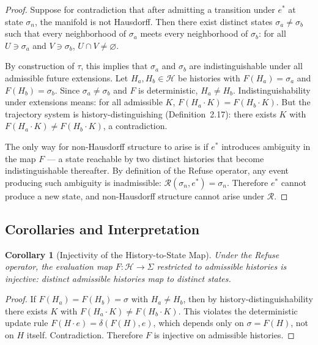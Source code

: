 \documentclass[12pt, twoside]{article}
\theoremstyle{plain}
\newtheorem{corollary}[theorem]{Corollary}
\theoremstyle{definition}
\theoremstyle{remark}
\begin{document}
\begin{proof}
Suppose for contradiction that after admitting a transition
under $e^*$ at state $\sigma_n$, the manifold is not Hausdorff.
Then there exist distinct states $\sigma_a \neq \sigma_b$
such that every neighborhood of $\sigma_a$ meets every neighborhood
of $\sigma_b$:
for all $U \ni \sigma_a$ and $V \ni \sigma_b$,
$U \cap V \neq \varnothing$.

By construction of $\tau$, this implies that $\sigma_a$ and $\sigma_b$
are indistinguishable under all admissible future extensions.
Let $H_a, H_b \in \mathcal{H}$ be histories with
$F(H_a) = \sigma_a$ and $F(H_b) = \sigma_b$.
Since $\sigma_a \neq \sigma_b$ and $F$ is deterministic,
$H_a \neq H_b$.
Indistinguishability under extensions means:
for all admissible $K$, $F(H_a \cdot K) = F(H_b \cdot K)$.
But the trajectory system is history-distinguishing
(Definition~2.17): there exists $K$ with
$F(H_a \cdot K) \neq F(H_b \cdot K)$, a contradiction.

The only way for non-Hausdorff structure to arise is if $e^*$
introduces ambiguity in the map $F$ — a state reachable by
two distinct histories that become indistinguishable thereafter.
By definition of the Refuse operator, any event producing such
ambiguity is inadmissible:
$\mathcal{R}(\sigma_n, e^*) = \sigma_n$.
Therefore $e^*$ cannot produce a new state, and non-Hausdorff
structure cannot arise under $\mathcal{R}$.
\end{proof}

\subsection{Corollaries and Interpretation}

\begin{corollary}[Injectivity of the History-to-State Map]
Under the Refuse operator, the evaluation map $F: \mathcal{H} \to \Sigma$
restricted to admissible histories is injective:
distinct admissible histories map to distinct states.
\end{corollary}

\begin{proof}
If $F(H_a) = F(H_b) = \sigma$ with $H_a \neq H_b$, then by
history-distinguishability there exists $K$ with
$F(H_a \cdot K) \neq F(H_b \cdot K)$.
This violates the deterministic update rule $F(H \cdot e) = \delta(F(H), e)$,
which depends only on $\sigma = F(H)$, not on $H$ itself.
Contradiction.
Therefore $F$ is injective on admissible histories.
\end{proof}
\end{document}
